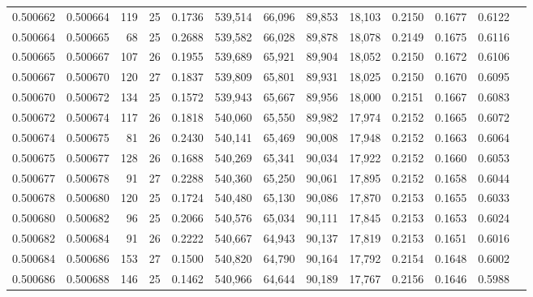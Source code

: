 \begin{tabular}{rrrrrrrrrrrrr}
0.500662 & 0.500664 & 119 &  25 &                                     0.1736 & 539,514 &  66,096 &  89,853 &  18,103 & 0.2150 & 0.1677 & 0.6122 \\
0.500664 & 0.500665 &  68 &  25 &                                     0.2688 & 539,582 &  66,028 &  89,878 &  18,078 & 0.2149 & 0.1675 & 0.6116 \\
0.500665 & 0.500667 & 107 &  26 &                                     0.1955 & 539,689 &  65,921 &  89,904 &  18,052 & 0.2150 & 0.1672 & 0.6106 \\
0.500667 & 0.500670 & 120 &  27 &                                     0.1837 & 539,809 &  65,801 &  89,931 &  18,025 & 0.2150 & 0.1670 & 0.6095 \\
0.500670 & 0.500672 & 134 &  25 &                                     0.1572 & 539,943 &  65,667 &  89,956 &  18,000 & 0.2151 & 0.1667 & 0.6083 \\
0.500672 & 0.500674 & 117 &  26 &                                     0.1818 & 540,060 &  65,550 &  89,982 &  17,974 & 0.2152 & 0.1665 & 0.6072 \\
0.500674 & 0.500675 &  81 &  26 &                                     0.2430 & 540,141 &  65,469 &  90,008 &  17,948 & 0.2152 & 0.1663 & 0.6064 \\
0.500675 & 0.500677 & 128 &  26 &                                     0.1688 & 540,269 &  65,341 &  90,034 &  17,922 & 0.2152 & 0.1660 & 0.6053 \\
0.500677 & 0.500678 &  91 &  27 &                                     0.2288 & 540,360 &  65,250 &  90,061 &  17,895 & 0.2152 & 0.1658 & 0.6044 \\
0.500678 & 0.500680 & 120 &  25 &                                     0.1724 & 540,480 &  65,130 &  90,086 &  17,870 & 0.2153 & 0.1655 & 0.6033 \\
0.500680 & 0.500682 &  96 &  25 &                                     0.2066 & 540,576 &  65,034 &  90,111 &  17,845 & 0.2153 & 0.1653 & 0.6024 \\
0.500682 & 0.500684 &  91 &  26 &                                     0.2222 & 540,667 &  64,943 &  90,137 &  17,819 & 0.2153 & 0.1651 & 0.6016 \\
0.500684 & 0.500686 & 153 &  27 &                                     0.1500 & 540,820 &  64,790 &  90,164 &  17,792 & 0.2154 & 0.1648 & 0.6002 \\
0.500686 & 0.500688 & 146 &  25 &                                     0.1462 & 540,966 &  64,644 &  90,189 &  17,767 & 0.2156 & 0.1646 & 0.5988 \\

\end{tabular}
